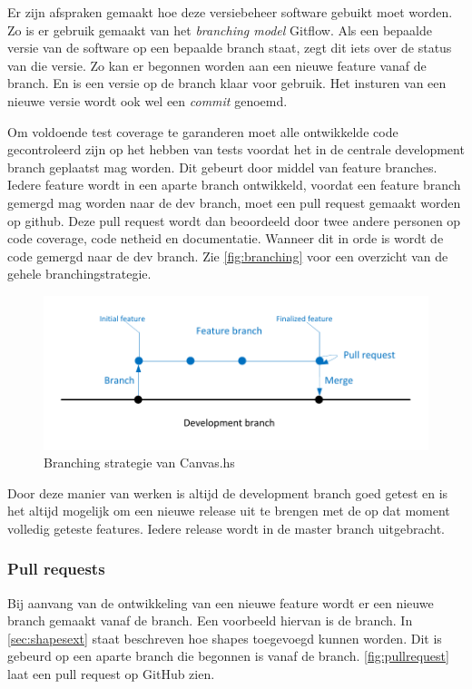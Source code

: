 Er zijn afspraken gemaakt hoe deze versiebeheer software gebuikt moet worden. Zo is er gebruik gemaakt van het \emph{branching model} Gitflow\cite{Gitflow2010}. Als een bepaalde versie van de software op een bepaalde branch staat, zegt dit iets over de status van die versie. Zo kan er begonnen worden aan een nieuwe feature vanaf de  branch. En is een versie op de  branch klaar voor gebruik. Het insturen van een nieuwe versie wordt ook wel een \emph{commit} genoemd.

Om voldoende test coverage te garanderen moet alle ontwikkelde code gecontroleerd zijn op het hebben van tests voordat het in de centrale development branch geplaatst mag worden. Dit gebeurt door middel van feature branches.  Iedere feature wordt in een aparte branch ontwikkeld, voordat een feature branch gemergd mag worden naar de dev branch, moet een pull request gemaakt worden op github. Deze pull request wordt dan beoordeeld door twee andere personen op code coverage, code netheid en documentatie. Wanneer dit in orde is wordt de code gemergd naar de dev branch. Zie  \autoref{fig:branching} voor een overzicht van de gehele branchingstrategie.

\begin{figure}
\begin{center}
\includegraphics[keepaspectratio,width=\textwidth]{./images/branching.pdf}
\caption{Branching strategie van Canvas.hs}
\label{fig:branching}
\end{center}
\end{figure}

Door deze manier van werken is altijd de development branch goed getest en is het altijd mogelijk om een nieuwe release uit te brengen met de op dat moment volledig geteste features. Iedere release wordt in de master branch uitgebracht.

\subsubsection{Pull requests}
Bij aanvang van de ontwikkeling van een nieuwe feature wordt er een nieuwe branch gemaakt vanaf de  branch. Een voorbeeld hiervan is de  branch. In \autoref{sec:shapesext} staat beschreven hoe  shapes toegevoegd kunnen worden. Dit is gebeurd op een aparte branch die begonnen is vanaf de  branch. \autoref{fig:pullrequest} laat een pull request op GitHub zien.

